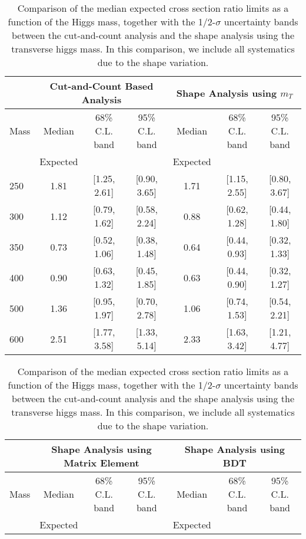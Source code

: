 \begin{table}[!ht]
\begin{center}
{\normalsize
\begin{tabular}{|l|c|c|c|c|c|c|}
\hline
      &  \multicolumn{3}{c|}{Cut-and-Count Based Analysis} &\multicolumn{3}{c|}{Shape Analysis using $m_T$} \\
\hline
Mass  &  Median      &     68\% C.L. band &  95\% C.L. band &  Median	   &	 68\% C.L. band &  95\% C.L. band\\
      &  Expected    &                    &                 &  Expected    &			&		 \\
\hline
250 & 1.81 & [1.25, 2.61] & [0.90, 3.65] & 1.71 & [1.15, 2.55] & [0.80, 3.67] \\
300 & 1.12 & [0.79, 1.62] & [0.58, 2.24] & 0.88 & [0.62, 1.28] & [0.44, 1.80] \\
350 & 0.73 & [0.52, 1.06] & [0.38, 1.48] & 0.64 & [0.44, 0.93] & [0.32, 1.33] \\
400 & 0.90 & [0.63, 1.32] & [0.45, 1.85] & 0.63 & [0.44, 0.90] & [0.32, 1.27] \\
500 & 1.36 & [0.95, 1.97] & [0.70, 2.78] & 1.06 & [0.74, 1.53] & [0.54, 2.21]\\
600 & 2.51 & [1.77, 3.58] & [1.33, 5.14] & 2.33 & [1.63, 3.42] & [1.21, 4.77]\\
\hline
\end{tabular}
}
\caption{\fixme Comparison of the median expected cross section ratio limits as a function 
of the Higgs mass, together with the 1/2-$\sigma$ uncertainty bands between the cut-and-count 
analysis and the shape analysis using the transverse higgs mass. In this comparison, we include all systematics due to 
the shape variation. }
\label{tab:mva_mtshapevscuts_withshapevar_hzz}
\end{center}
\begin{center}
{\normalsize
\begin{tabular}{|l|c|c|c|c|c|c|}
\hline
      &  \multicolumn{3}{c|}{Shape Analysis using Matrix Element} &\multicolumn{3}{c|}{Shape Analysis using BDT} \\
\hline
Mass  &  Median      &     68\% C.L. band &  95\% C.L. band &  Median	   &	 68\% C.L. band &  95\% C.L. band\\
      &  Expected    &                    &                 &  Expected    &			&		 \\

\end{tabular}}
\end{center}
\end{table}
